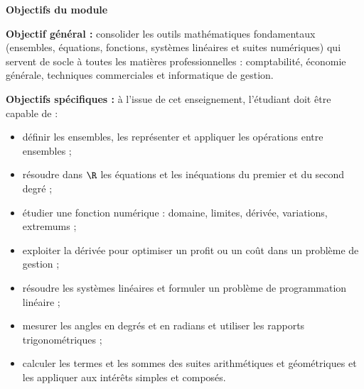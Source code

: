 
\renewcommand{\thesection}{\arabic{section}}

{\color{robleu}\Large\bfseries Objectifs du module}\par
\vspace{1.5mm}

\textbf{Objectif général :} consolider les outils mathématiques fondamentaux (ensembles, équations, fonctions, systèmes linéaires et suites numériques) qui servent de socle à toutes les matières professionnelles : comptabilité, économie générale, techniques commerciales et informatique de gestion.

\vspace{2.2mm}
\textbf{Objectifs spécifiques :} à l'issue de cet enseignement, l'étudiant doit être capable de :
\begin{itemize}\small
  \item définir les ensembles, les représenter et appliquer les opérations entre ensembles ;
  \item résoudre dans $\R$ les équations et les inéquations du premier et du second degré ;
  \item étudier une fonction numérique : domaine, limites, dérivée, variations, extremums ;
  \item exploiter la dérivée pour optimiser un profit ou un coût dans un problème de gestion ;
  \item résoudre les systèmes linéaires et formuler un problème de programmation linéaire ;
  \item mesurer les angles en degrés et en radians et utiliser les rapports trigonométriques ;
  \item calculer les termes et les sommes des suites arithmétiques et géométriques et les appliquer aux intérêts simples et composés.
\end{itemize}

\vspace{4mm}
\begingroup
\makeatletter
\setcounter{tocdepth}{1}
\renewcommand*\l@chapter{\bfseries\@dottedtocline{0}{0em}{2.0em}}
{\par}\vspace{1.5mm}
{\small{}}
\makeatother
\endgroup

\clearpage
{}
